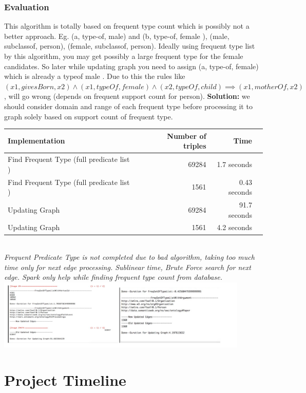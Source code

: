 \documentclass{easychair}
\begin{document}
\subsubsection{Evaluation}
This algorithm is totally based on frequent type count which is possibly not a better  approach. Eg. (a, type-of, male) and (b, type-of, female ), (male, subclassof, person), (female, subclassof, person). Ideally using frequent type list by this algorithm, you may get possibly a large frequent type for the female candidates. So later while updating graph you need to assign (a, type-of, female) which is already a typeof male . Due to this the rules like $(x1, givesBorn, x2) \land (x1, typeOf, female)\land (x2, typeOf, child) \implies (x1, motherOf, x2)$, will go wrong (depends on frequent support count for person). 
\textbf{Solution:} we should consider domain and range of each frequent type before processing it to graph solely based on support count of frequent type.\\

\begin{tabular}{lrrr}
    \hline
     Implementation            & Number of triples & Time   \\
   \hline
    Find Frequent Type (full predicate list )      &  69284 & 1.7 seconds  \\
     Find Frequent Type (full predicate list )      &  1561 & 0.43 seconds  \\
    Updating Graph     &  69284 & 91.7 seconds  \\
    Updating Graph     &  1561 & 4.2 seconds \\
  
   \hline
  \end{tabular}\\
  
\emph{Frequent Predicate Type is  not completed due to bad algorithm, taking too much time only for next edge processing. Sublinear time, Brute Force search for next edge. Spark only help while finding frequent type count from database. 
}\\

\includegraphics[width=0.9\textwidth]{akhilesh_result.png}
\section{Project Timeline}
\end{document}

